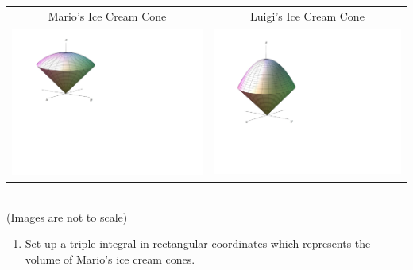 \documentclass[12pt]{article}
\begin{document}
\begin{enumerate}
\begin{center}
\begin{tabular}{cc}
Mario's Ice Cream Cone & Luigi's Ice Cream Cone\\
\includegraphics[scale=0.5]{Mario.pdf} & \includegraphics[scale=0.4]{Luigi.pdf}
\end{tabular}\\
(Images are not to scale)
\end{center}

\begin{enumerate}

\item Set up a triple integral in rectangular coordinates which represents the volume of Mario's ice cream cones.


\end{enumerate}
\end{enumerate}
\end{document}
